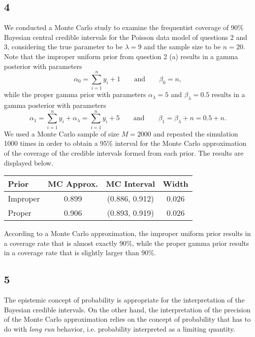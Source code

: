 \documentclass[12pt]{article}
\begin{document}
\subsection*{4} We conducted a Monte Carlo study to examine the frequentist coverage of 90\% Bayesian central credible intervals for the Poisson data model of
questions 2 and 3, considering the true parameter to be $\lambda = 9$ and the sample size to be $n = 20$. Note that the improper uniform prior from question 2 (a)
results in a gamma posterior with parameters 
\[ 
  \alpha_0 = \sum_{i=1}^{n}y_i + 1 \qquad \text{and} \qquad \beta_0 = n, 
\]
while the proper gamma prior with parameters $\alpha_{\lambda} = 5$ and $\beta_{\lambda} = 0.5$ results in a gamma posterior with parameters 
\[
  \alpha_1 = \sum_{i=1}^{n}y_i + \alpha_{\lambda} = \sum_{i=1}^n y_i + 5 \qquad \text{and} \qquad \beta_1 = \beta_{\lambda} + n = 0.5 + n.
\]
We used a Monte Carlo sample of size $M = 2000$ and repeated the simulation 1000 times in order to obtain a 95\% interval for the Monte Carlo
approximation of the coverage of the credible intervals formed from each prior. The results are displayed below.

\begin{table}[h]
  \centering
  \begin{tabular}{lccc}
    \hline
    Prior & MC Approx. & MC Interval & Width \\
    \hline
    Improper & 0.899 & (0.886, 0.912) & 0.026 \\
    Proper & 0.906 & (0.893, 0.919) & 0.026 \\
    \hline
  \end{tabular}
\end{table}

According to a Monte Carlo approximation, the improper uniform prior results in a coverage rate that is almost exactly 90\%, while the proper gamma
prior results in a coverage rate that is slightly larger than 90\%.


\subsection*{5} The epistemic concept of probability is appropriate for the interpretation of the Bayesian credible intervals.
On the other hand, the interpretation of the precision of the Monte Carlo approximation relies on the concept of probability that has to do with 
\emph{long run} behavior, i.e. probability interpreted as a limiting quantity.
\end{document}

